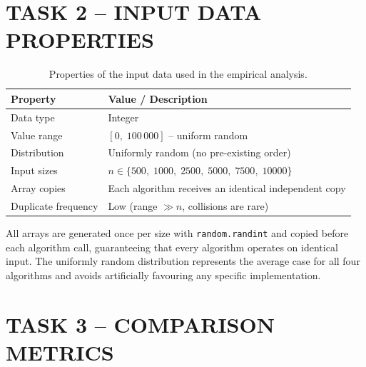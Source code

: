 \documentclass[12pt,a4paper]{article}
\begin{document}
	\section{TASK 2 -- INPUT DATA PROPERTIES}
	
	\begin{table}[h!]
		\centering
		\caption{Properties of the input data used in the empirical analysis.}
		\label{tab:input}
		\renewcommand{\arraystretch}{1.3}
		\begin{tabular}{ll}
			\toprule
			\textbf{Property}   & \textbf{Value / Description} \\
			\midrule
			Data type           & Integer \\
			Value range         & $[0,\;100\,000]$ -- uniform random \\
			Distribution        & Uniformly random (no pre-existing order) \\
			Input sizes         & $n \in \{500,\;1000,\;2500,\;5000,\;7500,\;10000\}$ \\
			Array copies        & Each algorithm receives an identical independent copy \\
			Duplicate frequency & Low (range $\gg n$, collisions are rare) \\
			\bottomrule
		\end{tabular}
	\end{table}
	
	\noindent All arrays are generated once per size with \texttt{random.randint}
	and copied before each algorithm call, guaranteeing that every algorithm
	operates on identical input. The uniformly random distribution represents the
	average case for all four algorithms and avoids artificially favouring any
	specific implementation.
	
	\section{TASK 3 -- COMPARISON METRICS}
	
\end{document}
